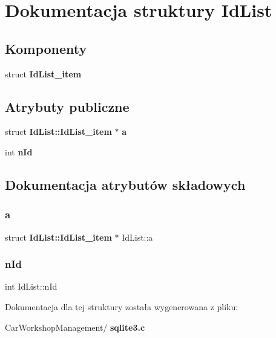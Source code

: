 \section{Dokumentacja struktury Id\+List}
\label{struct_id_list}
\subsection*{Komponenty}
\begin{DoxyCompactItemize}
\item 
struct \textbf{ Id\+List\+\_\+item}
\end{DoxyCompactItemize}
\subsection*{Atrybuty publiczne}
\begin{DoxyCompactItemize}
\item 
struct \textbf{ Id\+List\+::\+Id\+List\+\_\+item} $\ast$ \textbf{ a}
\item 
int \textbf{ n\+Id}
\end{DoxyCompactItemize}


\subsection{Dokumentacja atrybutów składowych}
\mbox{\label{struct_id_list_ad33082fd71286c1159711a1a3e979763}} 
\subsubsection{a}
{\footnotesize\ttfamily struct \textbf{ Id\+List\+::\+Id\+List\+\_\+item} $\ast$ Id\+List\+::a}

\mbox{\label{struct_id_list_afb785717796d8b3c72d1ae682dcb6ff0}} 
\subsubsection{nId}
{\footnotesize\ttfamily int Id\+List\+::n\+Id}



Dokumentacja dla tej struktury została wygenerowana z pliku\+:\begin{DoxyCompactItemize}
\item 
Car\+Workshop\+Management/\textbf{ sqlite3.\+c}\end{DoxyCompactItemize}
